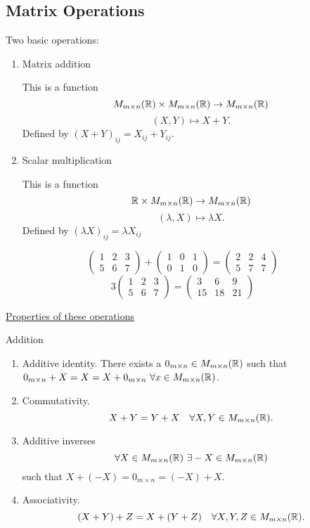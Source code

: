 \documentclass[10pt, a4paper]{article}
\begin{document}
\subsection{Matrix Operations}
Two basic operations:
\begin{enumerate}[label = (\roman*)]
    \item Matrix addition
    
    This is a function
    \[
    M_{m \times n}(\mathbb{R}) \times M_{m \times n}(\mathbb{R}) \rightarrow M_{m \times n}(\mathbb{R})
    \]
    \[
    (X, Y) \mapsto X + Y.
    \]
    Defined by $(X + Y)_{ij} = X_{ij} + Y_{ij}$.

    \item Scalar multiplication

    This is a function
    \[
    \mathbb{R} \times M_{m \times n}(\mathbb{R}) \rightarrow M_{m \times n}(\mathbb{R})
    \]
    \[
    (\lambda, X) \mapsto \lambda X.
    \]
    Defined by $(\lambda X)_{ij} = \lambda X_{ij}$
\end{enumerate}

\begin{example}
    \[
    \begin{pmatrix}
        1 & 2 & 3 \\ 5 & 6 & 7
    \end{pmatrix}
    +
    \begin{pmatrix}
        1 & 0 & 1 \\ 0 & 1 & 0
    \end{pmatrix}
    = \begin{pmatrix}
        2 & 2 & 4 \\ 5 & 7 & 7
    \end{pmatrix}
    \]
    \[
    3 \begin{pmatrix}
        1 & 2 & 3 \\ 5 & 6 & 7
    \end{pmatrix} = \begin{pmatrix}
        3 & 6 & 9 \\ 15 & 18 & 21
    \end{pmatrix}
    \]
\end{example}

\underline{Properties of these operations}

Addition
\begin{enumerate}[label = (\roman*)]
    \item Additive identity. There exists a $0_{m \times n} \in M_{m \times n}(\mathbb{R})$ such that $0_{m \times n} + X = X = X + 0_{m \times n}\ \forall x \in M_{m \times n}(\R)$.
    \item Commutativity.
    \[
    X + Y = Y + X\quad \forall X, Y \in M_{m \times n}(\mathbb{R}).
    \]
    \item Additive inverses
    \[
    \forall X \in M_{m \times n}(\mathbb{R})\ \exists -X \in M_{m \times n}(\mathbb{R})
    \]
    such that $X + (-X) = 0_{m \times n} = (-X) + X$.

    \item Associativity.
    \[
    (X + Y) + Z = X + (Y + Z)\quad\forall X, Y, Z \in M_{m \times n}(\mathbb{R}).
    \]
\end{enumerate}
\end{document}
